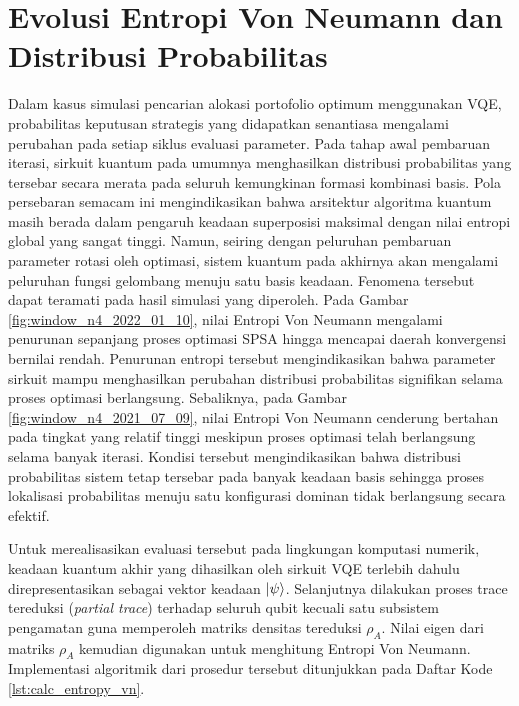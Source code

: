 \section{Evolusi Entropi Von Neumann dan Distribusi Probabilitas}
\label{sec:4_7_entropi_vqe}

Dalam kasus simulasi pencarian alokasi portofolio optimum menggunakan VQE, probabilitas keputusan strategis yang didapatkan senantiasa mengalami perubahan pada setiap siklus evaluasi parameter. Pada tahap awal pembaruan iterasi, sirkuit kuantum pada umumnya menghasilkan distribusi probabilitas yang tersebar secara merata pada seluruh kemungkinan formasi kombinasi basis. Pola persebaran semacam ini mengindikasikan bahwa arsitektur algoritma kuantum masih berada dalam pengaruh keadaan superposisi maksimal dengan nilai entropi global yang sangat tinggi. Namun, seiring dengan peluruhan pembaruan parameter rotasi oleh optimasi, sistem kuantum pada akhirnya akan mengalami peluruhan fungsi gelombang menuju satu basis keadaan. Fenomena tersebut dapat teramati pada hasil simulasi yang diperoleh. Pada Gambar \ref{fig:window_n4_2022_01_10}, nilai Entropi Von Neumann mengalami penurunan sepanjang proses optimasi SPSA hingga mencapai daerah konvergensi bernilai rendah. Penurunan entropi tersebut mengindikasikan bahwa parameter sirkuit mampu menghasilkan perubahan distribusi probabilitas signifikan selama proses optimasi berlangsung. Sebaliknya, pada Gambar \ref{fig:window_n4_2021_07_09}, nilai Entropi Von Neumann cenderung bertahan pada tingkat yang relatif tinggi meskipun proses optimasi telah berlangsung selama banyak iterasi. Kondisi tersebut mengindikasikan bahwa distribusi probabilitas sistem tetap tersebar pada banyak keadaan basis sehingga proses lokalisasi probabilitas menuju satu konfigurasi dominan tidak berlangsung secara efektif.

Untuk merealisasikan evaluasi tersebut pada lingkungan komputasi numerik, keadaan kuantum akhir yang dihasilkan oleh sirkuit VQE terlebih dahulu direpresentasikan sebagai vektor keadaan \(\ket{\psi}\). Selanjutnya dilakukan proses trace tereduksi (\textit{partial trace}) terhadap seluruh qubit kecuali satu subsistem pengamatan guna memperoleh matriks densitas tereduksi \(\rho_A\). Nilai eigen dari matriks \(\rho_A\) kemudian digunakan untuk menghitung Entropi Von Neumann. Implementasi algoritmik dari prosedur tersebut ditunjukkan pada Daftar Kode \ref{lst:calc_entropy_vn}.

